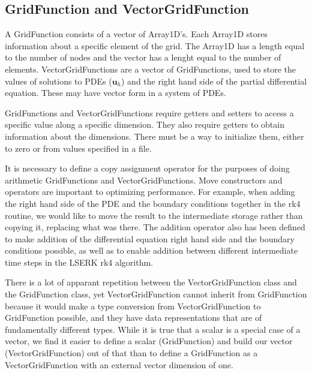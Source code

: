 \documentclass{article}
\begin{document}
\subsection{GridFunction and VectorGridFunction}


A GridFunction consists of a vector of Array1D's. Each Array1D stores
information about a specific element of the grid. The Array1D has a length equal to the number of nodes and the vector has a lenght equal to the number of elements. VectorGridFunctions are a vector of GridFunctions, used to
store the values of solutions to PDEs ($\boldsymbol{u}_h$) and the
right hand side of the partial differential equation. These may have
vector form in a system of PDEs.

GridFunctions and VectorGridFunctions require getters and setters to
access a specific value along a specific dimension.  They also require
getters to obtain information about the dimensions. There must be a
way to initialize them, either to zero or from values specified in a
file. 

It is necessary to define a copy assignment operator for the
purposes of doing arithmetic GridFunctions and
VectorGridFunctions. Move constructors and operators are important to
optimizing performance. For example, when adding the right hand side
of the PDE and the boundary conditions together in the rk4 routine, we
would like to move the result to the intermediate storage rather than
copying it, replacing what was there. The addition operator also has
been defined to make addition of the differential equation right hand
side and the boundary conditions possible, as well as to enable
addition between different intermediate time steps in the LSERK rk4
algorithm.

There is a lot of apparant repetition between the VectorGridFunction
class and the GridFunction class, yet VectorGridFunction cannot
inherit from GridFunction because it would make a type conversion
from VectorGridFunction to GridFunction possible, and they have data
representations that are of fundamentally different types. While it is
true that a scalar is a special case of a vector, we find it easier to
define a scalar (GridFunction) and build our vector
(VectorGridFunction) out of that than to define a GridFunction as a
VectorGridFunction with an external vector dimension of one.
\end{document}
